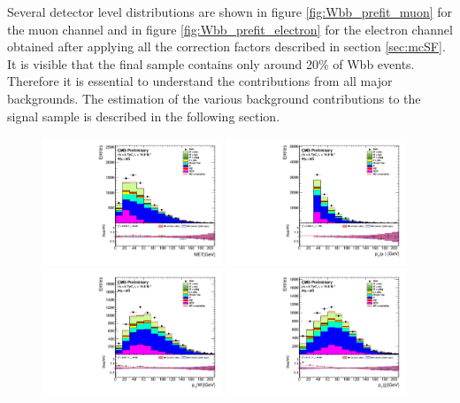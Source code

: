 Several detector level distributions are shown in figure \ref{fig:Wbb_prefit_muon} for the muon channel and in figure \ref{fig:Wbb_prefit_electron} for the electron channel obtained after applying all the correction factors described in section \ref{sec:mcSF}. It is visible that the final sample contains only around 20$\%$ of Wbb events. Therefore it is essential to understand the contributions from all major backgrounds. The estimation of the various background contributions to the signal sample is described in the following section. 
\begin{figure}[htbp]
	\centering
		\includegraphics[width=0.48\textwidth]{Figures/Results/Muon/prefit/Wbb_GetMET_doQCD1.pdf}
		\includegraphics[width=0.48\textwidth]{Figures/Results/Muon/prefit/Wbb_vLepton_pt_doQCD1.pdf}
		\includegraphics[width=0.48\textwidth]{Figures/Results/Muon/prefit/Wbb_GetWpt_doQCD1.pdf}
		\includegraphics[width=0.48\textwidth]{Figures/Results/Muon/prefit/Wbb_H_pt_doQCD1.pdf}

\end{figure}
